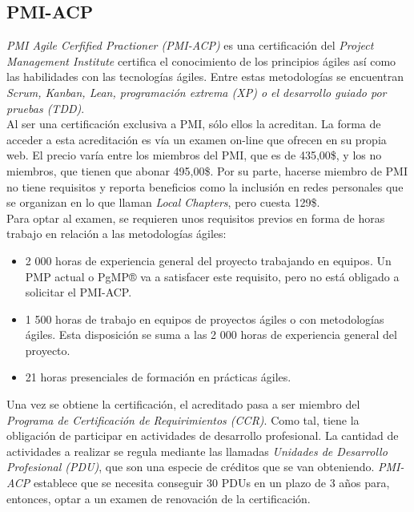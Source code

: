 \subsection{PMI-ACP}

\emph{PMI Agile Cerfified Practioner (PMI-ACP)} es una certificación del \emph{Project Management Institute} certifica el conocimiento de los principios ágiles así como las habilidades con las tecnologías ágiles. Entre estas metodologías se encuentran \emph{Scrum, Kanban, Lean, programación extrema (XP) o el desarrollo guiado por pruebas (TDD)}.\\

Al ser una certificación exclusiva a PMI, sólo ellos la acreditan. La forma de acceder a esta acreditación es vía un examen on-line que ofrecen en su propia web. El precio varía entre los miembros del PMI, que es de 435,00\$, y los no miembros, que tienen que abonar 495,00\$. Por su parte, hacerse miembro de PMI no tiene requisitos y reporta beneficios como la inclusión en redes personales que se organizan en lo que llaman \emph{Local Chapters}, pero cuesta 129\$.\\

Para optar al examen, se requieren unos requisitos previos en forma de horas trabajo en relación a las metodologías ágiles:
\begin{itemize}
	\item 2 000 horas de experiencia general del proyecto trabajando en equipos. Un PMP actual o PgMP® va a satisfacer este requisito, pero no está obligado a solicitar el PMI-ACP.
	\item 1 500 horas de trabajo en equipos de proyectos ágiles o con metodologías ágiles. Esta disposición se suma a las 2 000 horas de experiencia general del proyecto.
	\item 21 horas presenciales de formación en prácticas ágiles.
\end{itemize}

Una vez se obtiene la certificación, el acreditado pasa a ser miembro del \emph{Programa de Certificación de Requirimientos (CCR)}. Como tal, tiene la obligación de participar en actividades de desarrollo profesional. La cantidad de actividades a realizar se regula mediante las llamadas \emph{Unidades de Desarrollo Profesional (PDU)}, que son una especie de créditos que se van obteniendo. \emph{PMI-ACP} establece que se necesita conseguir 30 PDUs en un plazo de 3 años para, entonces, optar a un examen de renovación de la certificación.\\

